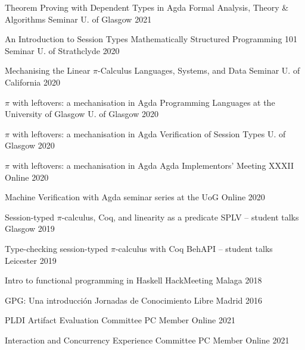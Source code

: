 \documentclass[11pt, a4paper]{awesome-cv}
\begin{document}
\begin{cvhonors}
  \cvhonor
  {Theorem Proving with Dependent Types in Agda}
  {Formal Analysis, Theory \& Algorithms Seminar}
  {U. of Glasgow}
  {2021}

  \cvhonor
  {An Introduction to Session Types}
  {Mathematically Structured Programming 101 Seminar}
  {U. of Strathclyde}
  {2020}

  \cvhonor
  {Mechanising the Linear $\pi$-Calculus}
  {Languages, Systems, and Data Seminar}
  {U. of California}
  {2020}

  \cvhonor
  {$\pi$ with leftovers: a mechanisation in Agda}
  {Programming Languages at the University of Glasgow}
  {U. of Glasgow}
  {2020}

  \cvhonor
  {$\pi$ with leftovers: a mechanisation in Agda}
  {Verification of Session Types}
  {U. of Glasgow}
  {2020}

  \cvhonor
  {$\pi$ with leftovers: a mechanisation in Agda}
  {Agda Implementors' Meeting XXXII}
  {Online}
  {2020}

  \cvhonor
  {Machine Verification with Agda}
  {seminar series at the UoG}
  {Online}
  {2020}

    \cvhonor
      {Session-typed $\pi$-calculus, Coq, and linearity as a predicate}
      {SPLV -- student talks}
      {Glasgow} %
      {2019} %

    \cvhonor
      {Type-checking session-typed $\pi$-calculus with Coq}
      {BehAPI -- student talks}
      {Leicester} %
      {2019} %

    \cvhonor
      {Intro to functional programming in Haskell}
      {HackMeeting}
      {Malaga} %
      {2018} %

    \cvhonor
      {GPG: Una introducción}
      {Jornadas de Conocimiento Libre}
      {Madrid} %
      {2016} %
\end{cvhonors}


\begin{cvhonors}
  \cvhonor
    {PLDI Artifact Evaluation Committee}
    {PC Member}
    {Online}
    {2021}

  \cvhonor
    {Interaction and Concurrency Experience Committee}
    {PC Member}
    {Online}
    {2021}

\end{cvhonors}

\end{document}

